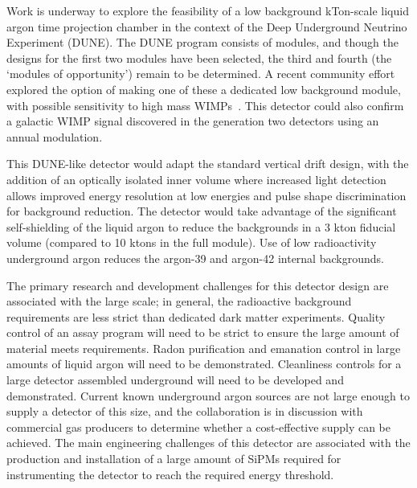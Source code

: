 Work is underway to explore the feasibility of a low background kTon-scale liquid argon time projection chamber in the context of the Deep Underground Neutrino Experiment (DUNE).  The DUNE program consists of modules, and though the designs for the first two modules have been selected, the third and fourth (the `modules of opportunity’) remain to be determined.  A recent community effort~\cite{SnowmassLowBgDUNElikeWP} explored the option of making one of these a dedicated low background module, with possible sensitivity to high mass WIMPs~\cite{Church_2020}.  This detector could also confirm a galactic WIMP signal discovered in the generation two detectors using an annual modulation.  

This DUNE-like detector would adapt the standard vertical drift design, with the addition of an optically isolated inner volume where increased light detection allows improved energy resolution at low energies and pulse shape discrimination for background reduction.  The detector would take advantage of the significant self-shielding of the liquid argon to reduce the backgrounds in a 3 kton fiducial volume (compared to 10 ktons in the full module).  Use of low radioactivity underground argon reduces the argon-39 and argon-42 internal backgrounds.

The primary research and development challenges for this detector design are associated with the large scale; in general, the radioactive background requirements are less strict than dedicated dark matter experiments.  Quality control of an assay program will need to be strict to ensure the large amount of material meets requirements.  Radon purification and emanation control in large amounts of liquid argon will need to be demonstrated.  Cleanliness controls for a large detector assembled underground will need to be developed and demonstrated.  Current known underground argon sources are not large enough to supply a detector of this size, and the collaboration is in discussion with commercial gas producers to determine whether a cost-effective supply can be achieved.  The main engineering challenges of this detector are associated with the production and installation of a large amount of SiPMs required for instrumenting the detector to reach the required energy threshold.